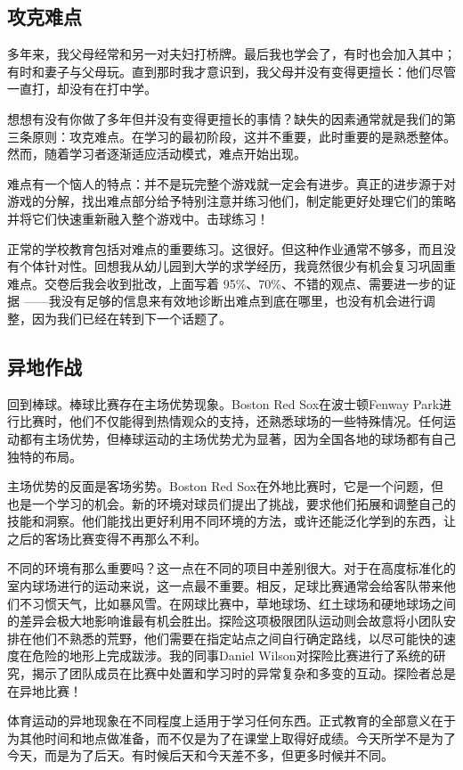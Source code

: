\subsection*{攻克难点}
多年来，我父母经常和另一对夫妇打桥牌。最后我也学会了，有时也会加入其中；有时和妻子与父母玩。直到那时我才意识到，我父母并没有变得更擅长：他们尽管一直打，却没有在打中学。

想想有没有你做了多年但并没有变得更擅长的事情？缺失的因素通常就是我们的第三条原则：攻克难点。在学习的最初阶段，这并不重要，此时重要的是熟悉整体。然而，随着学习者逐渐适应活动模式，难点开始出现。

难点有一个恼人的特点：并不是玩完整个游戏就一定会有进步。真正的进步源于对游戏的分解，找出难点部分给予特别注意并练习他们，制定能更好处理它们的策略并将它们快速重新融入整个游戏中。击球练习！

正常的学校教育包括对难点的重要练习。这很好。但这种作业通常不够多，而且没有个体针对性。回想我从幼儿园到大学的求学经历，我竟然很少有机会复习巩固重难点。交卷后我会收到批改，上面写着 95\%、70\%、不错的观点、需要进一步的证据
——我没有足够的信息来有效地诊断出难点到底在哪里，也没有机会进行调整，因为我们已经在转到下一个话题了。

\subsection*{异地作战}
回到棒球。棒球比赛存在主场优势现象。Boston Red Sox在波士顿Fenway Park进行比赛时，他们不仅能得到热情观众的支持，还熟悉球场的一些特殊情况。任何运动都有主场优势，但棒球运动的主场优势尤为显著，因为全国各地的球场都有自己独特的布局。

主场优势的反面是客场劣势。Boston Red Sox在外地比赛时，它是一个问题，但也是一个学习的机会。新的环境对球员们提出了挑战，要求他们拓展和调整自己的技能和洞察。他们能找出更好利用不同环境的方法，或许还能泛化学到的东西，让之后的客场比赛变得不再那么不利。

不同的环境有那么重要吗？这一点在不同的项目中差别很大。对于在高度标准化的室内球场进行的运动来说，这一点最不重要。相反，足球比赛通常会给客队带来他们不习惯天气，比如暴风雪。在网球比赛中，草地球场、红土球场和硬地球场之间的差异会极大地影响谁最有机会胜出。探险这项极限团队运动则会故意将小团队安排在他们不熟悉的荒野，他们需要在指定站点之间自行确定路线，以尽可能快的速度在危险的地形上完成跋涉。我的同事Daniel Wilson对探险比赛进行了系统的研究，揭示了团队成员在比赛中处置和学习时的异常复杂和多变的互动。探险者总是在异地比赛！

体育运动的异地现象在不同程度上适用于学习任何东西。正式教育的全部意义在于为其他时间和地点做准备，而不仅是为了在课堂上取得好成绩。今天所学不是为了今天，而是为了后天。有时候后天和今天差不多，但更多时候并不同。

